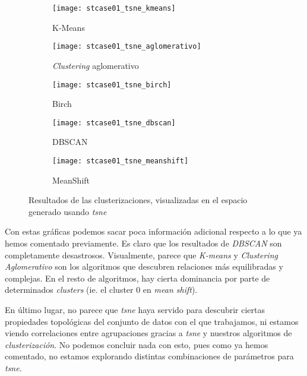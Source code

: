 \documentclass[11pt]{article}
\begin{document}
\begin{figure}[H]
    \centering

    \begin{subfigure}[b]{0.45 \textwidth}
        \texttt{[image: stcase01\_tsne\_kmeans]}
        \caption{K-Means}
    \end{subfigure}
    \begin{subfigure}[b]{0.45 \textwidth}
        \texttt{[image: stcase01\_tsne\_aglomerativo]}
        \caption{\emph{Clustering} aglomerativo}
    \end{subfigure}

    \begin{subfigure}[b]{0.45 \textwidth}
        \texttt{[image: stcase01\_tsne\_birch]}
        \caption{Birch}
    \end{subfigure}
    \begin{subfigure}[b]{0.45 \textwidth}
        \texttt{[image: stcase01\_tsne\_dbscan]}
        \caption{DBSCAN}
    \end{subfigure}

    \begin{subfigure}[b]{0.45 \textwidth}
        \texttt{[image: stcase01\_tsne\_meanshift]}
        \caption{MeanShift}
    \end{subfigure}

        \caption{Resultados de las clusterizaciones, visualizadas en el espacio generado usando \emph{tsne}}
\end{figure}

Con estas gráficas podemos sacar poca información adicional respecto a lo que ya hemos comentado previamente. Es claro que los resultados de \emph{DBSCAN} son completamente desastrosos. Visualmente, parece que \emph{K-means} y \emph{Clustering Aglomerativo} son los algoritmos que descubren relaciones más equilibradas y complejas. En el resto de algoritmos, hay cierta dominancia por parte de determinados \emph{clusters} (ie. el cluster 0 en \emph{mean shift}).

En último lugar, no parece que \emph{tsne} haya servido para descubrir ciertas propiedades topológicas del conjunto de datos con el que trabajamos, ni estamos viendo correlaciones entre agrupaciones gracias a \emph{tsne} y nuestros algoritmos de \emph{clusterización}. No podemos concluir nada con esto, pues como ya hemos comentado, no estamos explorando distintas combinaciones de parámetros para \emph{tsne}.
\end{document}
